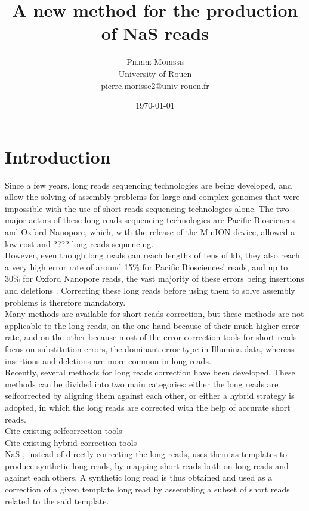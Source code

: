 \documentclass[twoside,twocolumn]{article}
\title{A new method for the production of NaS reads} %
\author{%
\textsc{Pierre Morisse} \\[1ex] %
\normalsize University of Rouen \\ %
\normalsize \href{mailto:pierre.morisse2@univ-rouen.fr}{pierre.morisse2@univ-rouen.fr} %
}
\date{\today} %
\begin{document}
\maketitle


\section{Introduction}

Since a few years, long reads sequencing technologies are being developed, and allow the solving of assembly problems for large and complex
genomes that were impossible with the use of short reads sequencing technologies alone. The two major actors of these long reads sequencing technologies are
Pacific Biosciences and Oxford Nanopore, which, with the release of the MinION device, allowed a low-cost and ???? long reads sequencing. \\
\indent However, even though long reads can reach lengths of tens of kb, they also reach a very high error rate of around 15\% for Pacific Biosciences' reads, and up to 30\% for Oxford Nanopore reads, the vast majority of these errors being insertions and deletions . Correcting these long reads before using them to solve assembly problems is therefore mandatory. \\
\indent Many methods are available for short reads correction, but these methods are not applicable to the long reads, on the one hand because 
of their much higher error rate, and on the other because most of the error correction tools for short reads focus on substitution errors,
the dominant error type in Illumina data, whereas insertions and deletions are more common in long reads. \\
\indent Recently, several methods for long reads correction have been developed. These methods can be divided into two main categories: either
the long reads are selfcorrected by aligning them against each other, or either a hybrid strategy is adopted, in which the long reads
are corrected with the help of accurate short reads. \\
\indent Cite existing selfcorrection tools \\
\indent Cite existing hybrid correction tools \\
\indent NaS \cite{Madoui2015}, instead of directly correcting the long reads, uses them as templates to produce synthetic long reads, by mapping short reads both on long reads and against each others. A synthetic long read is thus obtained and used as a correction of a given template long read by assembling a subset of short reads related to the said template. \\
\end{document}
